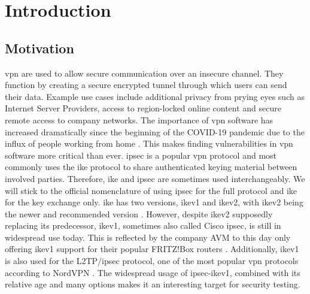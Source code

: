%
%
% 
% 
% 

\chapter{Introduction}

\label{chap:Introduction}

\section{Motivation}
\ac{vpn} are used to allow secure communication over an insecure channel. They function by creating a secure encrypted tunnel through which users can send their data. Example use cases include additional privacy from prying eyes such as Internet Server Providers, access to region-locked online content and secure remote access to company networks. The importance of \ac{vpn} software has increased dramatically since the beginning of the COVID-19 pandemic due to the influx of people working from home \parencite{abhijith2020impact}. This makes finding vulnerabilities in \ac{vpn} software more critical than ever. %
\ac{ipsec} is a popular \ac{vpn} protocol and most commonly uses the \ac{ike} protocol to share authenticated keying material between involved parties. Therefore, \ac{ike} and \ac{ipsec} are sometimes used interchangeably. We will stick to the official nomenclature of using \ac{ipsec} for the full protocol and \ac{ike} for the key exchange only. \ac{ike} has two versions, \ac{ike}v1 and \ac{ike}v2, with \ac{ike}v2 being the newer and recommended version \parencite{nist791491}. However, despite \ac{ike}v2 supposedly replacing its predecessor, \ac{ike}v1, sometimes also called Cisco \ac{ipsec}, is still in widespread use today. This is reflected by the company AVM to this day only offering \ac{ike}v1 support for their popular FRITZ!Box routers \parencite{avm2022}. Additionally, \ac{ike}v1 is also used for the L2TP/\ac{ipsec} protocol, one of the most popular \ac{vpn} protocols according to NordVPN \parencite{nordvpn2021}. The widespread usage of \ac{ipsec}-\ac{ike}v1, combined with its relative age and many options makes it an interesting target for security testing.


